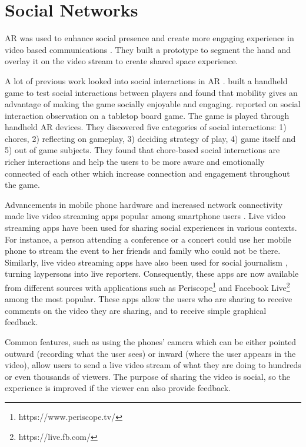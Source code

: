 \section{Social Networks}

AR was used to enhance social presence and create more engaging experience in video based communications \cite{Almeida2012}. They built a prototype to segment the hand and overlay it on the video stream to create shared space experience.

A lot of previous work looked into social interactions in AR \cite{Schmalstieg_144, Xu2008, Xu2011, Faas2010}. \textcite{Schmalstieg_144} built a handheld game to test social interactions between players and found that mobility gives an advantage of making the game socially enjoyable and engaging. \textcite{Xu2011} reported on social interaction observation on a tabletop board game. The game is played through handheld AR devices. They discovered five categories of social interactions: 1) chores, 2) reflecting on gameplay, 3) deciding strategy of play, 4) game itself and 5) out of game subjects. They found that chore-based social interactions are richer interactions and help the users to be more aware and emotionally connected of each other which increase connection and engagement throughout the game.

Advancements in mobile phone hardware and increased network connectivity made live video streaming apps popular among smartphone users \cite{Liu2008}. Live video streaming apps have been used for sharing social experiences in various contexts. For instance, a person attending a conference or a concert could use her mobile phone to stream the event to her friends and family who could not be there. Similarly, live video streaming apps have also been used for social journalism \cite{Lenzner2014}, turning laypersons into live reporters. Consequently, these apps are now available from different sources with applications such as Periscope\footnote{https://www.periscope.tv/} and Facebook Live\footnote{https://live.fb.com/} among the most popular. These apps allow the users who are sharing to receive comments on the video they are sharing, and to receive simple graphical feedback. 

Common features, such as using the phones' camera which can be either pointed outward (recording what the user sees) or inward (where the user appears in the video), allow users to send a live video stream of what they are doing to hundreds or even thousands of viewers. The purpose of sharing the video is social, so the experience is improved if the viewer can also provide feedback.

